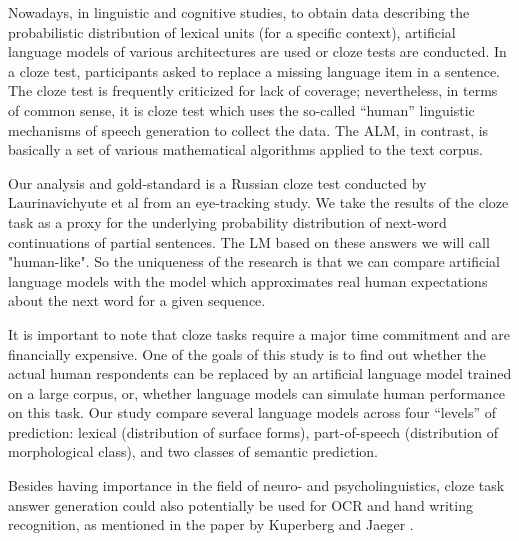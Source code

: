 \documentclass[a4paper]{article}
\begin{document}
Nowadays, in linguistic and cognitive studies, to obtain data describing the probabilistic distribution of lexical units (for a specific context), artificial language models of various architectures are used or cloze tests are conducted. In a cloze test, participants asked to replace a missing language item in a sentence. The cloze test is frequently criticized for lack of coverage; nevertheless, in terms of common sense, it is cloze test which uses the so-called “human” linguistic mechanisms of speech generation to collect the data. The ALM, in contrast, is basically a set of various mathematical algorithms applied to the text corpus.

Our analysis and gold-standard is a Russian cloze test conducted by Laurinavichyute et al \cite{laurinavichyute} from an eye-tracking study. We take the results of the cloze task as a proxy for the underlying probability distribution of next-word continuations of partial sentences.
The LM based on these answers we will call "human-like". So the uniqueness of the research is that we can compare artificial language models with the model which approximates real human expectations about the next word for a given sequence.

It is important to note that cloze tasks require a major time commitment and are financially expensive. One of the goals of this study is to find out whether the actual human respondents can be replaced by an artificial language model trained on a large corpus, or, whether language models can simulate human performance on this task.
Our study compare several language models across four ``levels'' of prediction: lexical (distribution of surface forms), part-of-speech (distribution of morphological class), and two classes of semantic prediction.

Besides having importance in the field of neuro- and psycholinguistics, cloze task answer generation could also potentially be used for OCR and hand writing recognition, as mentioned in the paper by Kuperberg and Jaeger \cite{kuperberg-jaeger}.
\end{document}
